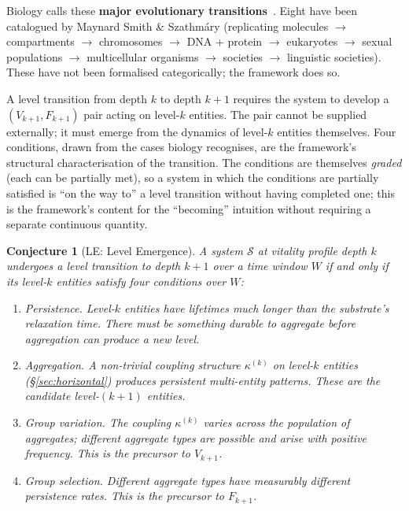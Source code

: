 \documentclass[journal]{IEEEtran}
\theoremstyle{plain}
\theoremstyle{definition}
\theoremstyle{plain}
\newtheorem*{conjecturestar}{Conjecture}
\newenvironment{namedconjecture}[1]{%
  \begin{conjecturestar}[#1]%
}{\end{conjecturestar}}
\begin{document}
Biology calls these \textbf{major evolutionary
transitions}~\cite{maynardsmith1995major,buss1987evolution,west2015majortransitions}.
Eight have been catalogued by Maynard Smith \& Szathm\'ary (replicating
molecules $\to$ compartments $\to$ chromosomes $\to$ DNA + protein
$\to$ eukaryotes $\to$ sexual populations $\to$ multicellular
organisms $\to$ societies $\to$ linguistic societies). These have
not been formalised categorically; the framework does so.

A level transition from depth $k$ to depth $k + 1$ requires the
system to develop a $(V_{k+1}, F_{k+1})$ pair acting on level-$k$
entities. The pair cannot be supplied externally; it must emerge from
the dynamics of level-$k$ entities themselves. Four conditions, drawn
from the cases biology recognises, are the framework's structural
characterisation of the transition. The conditions are themselves
\emph{graded} (each can be partially met), so a system in which the
conditions are partially satisfied is ``on the way to'' a level
transition without having completed one; this is the framework's
content for the ``becoming'' intuition without requiring a separate
continuous quantity.

\begin{namedconjecture}{LE: Level Emergence}
A system $\mathcal{S}$ at vitality profile depth $k$ undergoes a
level transition to depth $k + 1$ over a time window $W$ if and only
if its level-$k$ entities satisfy four conditions over $W$:

\begin{enumerate}[leftmargin=2em,itemsep=2pt]
  \item \emph{Persistence.} Level-$k$ entities have lifetimes much
    longer than the substrate's relaxation time. There must be
    something durable to aggregate before aggregation can produce a
    new level.
  \item \emph{Aggregation.} A non-trivial coupling structure
    $\kappa^{(k)}$ on level-$k$ entities (\S\ref{sec:horizontal})
    produces persistent multi-entity patterns. These are the
    \emph{candidate} level-$(k{+}1)$ entities.
  \item \emph{Group variation.} The coupling $\kappa^{(k)}$ varies
    across the population of aggregates; different aggregate types
    are possible and arise with positive frequency. This is the
    precursor to $V_{k+1}$.
  \item \emph{Group selection.} Different aggregate types have
    measurably different persistence rates. This is the precursor to
    $F_{k+1}$.
\end{enumerate}
\end{namedconjecture}
\end{document}

